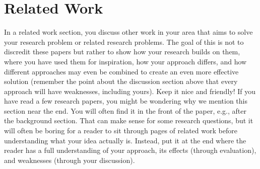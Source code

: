 \chapter{Related Work}
In a related work section, you discuss other work in your area that aims to solve your research problem or related research problems. The goal of this is not to discredit these papers but rather to show how your research builds on them, where you have used them for inspiration, how your approach differs, and how different approaches may even be combined to create an even more effective solution (remember the point about the discussion section above that every approach will have weaknesses, including yours). Keep it nice and friendly!
If you have read a few research papers, you might be wondering why we mention this section near the end. You will often find it in the front of the paper, e.g., after the background section. That can make sense for some research questions, but it will often be boring for a reader to sit through pages of related work before understanding what your idea actually is. Instead, put it at the end where the reader has a full understanding of your approach, its effects (through evaluation), and weaknesses (through your discussion).